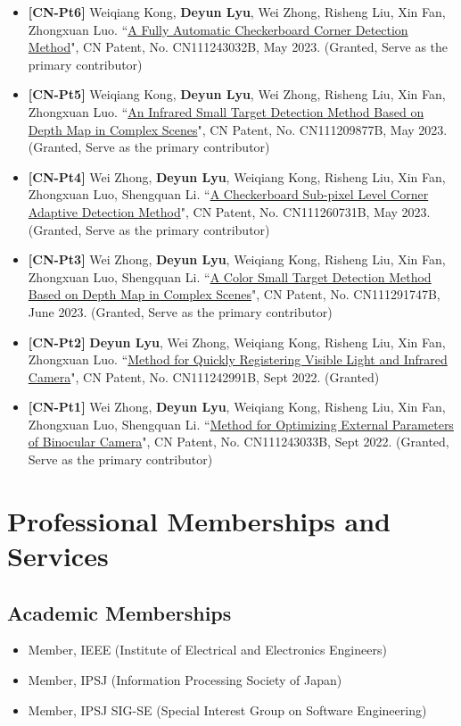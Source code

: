 \documentclass[11pt,a4paper]{moderncv}        %
\begin{document}
\begin{itemize}
    \item \textbf{[CN-Pt6]} Weiqiang Kong, \textbf{Deyun Lyu}, Wei Zhong, Risheng Liu, Xin Fan, Zhongxuan Luo. ``\href{https://patents.google.com/patent/CN111243032B/en}{A Fully Automatic Checkerboard Corner Detection Method}", CN Patent, No. CN111243032B, May 2023. (Granted, Serve as the primary contributor)
    \item \textbf{[CN-Pt5]} Weiqiang Kong, \textbf{Deyun Lyu}, Wei Zhong, Risheng Liu, Xin Fan, Zhongxuan Luo. ``\href{https://patents.google.com/patent/CN111209877B/en}{An Infrared Small Target Detection Method Based on Depth Map in Complex Scenes}", CN Patent, No. CN111209877B, May 2023. (Granted, Serve as the primary contributor)
    \item \textbf{[CN-Pt4]} Wei Zhong, \textbf{Deyun Lyu}, Weiqiang Kong, Risheng Liu, Xin Fan, Zhongxuan Luo, Shengquan Li. ``\href{https://patents.google.com/patent/CN111260731B/en}{A Checkerboard Sub-pixel Level Corner Adaptive Detection Method}", CN Patent, No. CN111260731B, May 2023. (Granted, Serve as the primary contributor)
    \item \textbf{[CN-Pt3]} Wei Zhong, \textbf{Deyun Lyu}, Weiqiang Kong, Risheng Liu, Xin Fan, Zhongxuan Luo, Shengquan Li. ``\href{https://patents.google.com/patent/CN111291747B/en}{A Color Small Target Detection Method Based on Depth Map in Complex Scenes}", CN Patent, No. CN111291747B, June 2023. (Granted, Serve as the primary contributor)
    \item \textbf{[CN-Pt2]} \textbf{Deyun Lyu}, Wei Zhong, Weiqiang Kong, Risheng Liu, Xin Fan, Zhongxuan Luo. ``\href{https://patents.google.com/patent/CN111242991B/en}{Method for Quickly Registering Visible Light and Infrared Camera}", CN Patent, No. CN111242991B, Sept 2022. (Granted)
    \item \textbf{[CN-Pt1]} Wei Zhong, \textbf{Deyun Lyu}, Weiqiang Kong, Risheng Liu, Xin Fan, Zhongxuan Luo, Shengquan Li. ``\href{https://patents.google.com/patent/CN111243033B/en}{Method for Optimizing External Parameters of Binocular Camera}", CN Patent, No. CN111243033B, Sept 2022. (Granted, Serve as the primary contributor)
\end{itemize}


\section{Professional Memberships and Services}

\subsection{Academic Memberships}
\begin{itemize}
  \item Member, IEEE (Institute of Electrical and Electronics Engineers) \hfill  
  \item Member, IPSJ (Information Processing Society of Japan)
  \item Member, IPSJ SIG-SE (Special Interest Group on Software Engineering)
\end{itemize}
\end{document}
